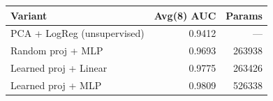 \begin{tabular}{lrr}
\toprule
Variant & Avg(8) AUC & Params \\
\midrule
PCA + LogReg (unsupervised) & 0.9412 & --- \\
Random proj + MLP & 0.9693 & 263938 \\
Learned proj + Linear & 0.9775 & 263426 \\
Learned proj + MLP & 0.9809 & 526338 \\
\bottomrule
\end{tabular}